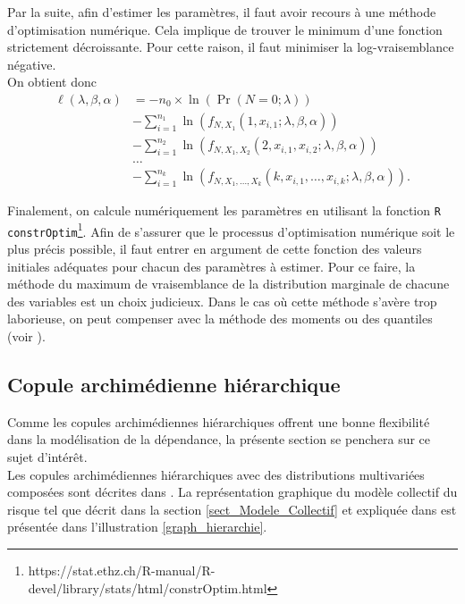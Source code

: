 \documentclass{article}
\begin{document}
		Par la suite, afin d'estimer les paramètres, il faut avoir recours à une méthode d'optimisation numérique. Cela implique de trouver le minimum d'une fonction strictement décroissante. Pour cette raison, il faut minimiser la log-vraisemblance négative.\\
		
		On obtient donc
		\begin{align}
		\ell(\lambda, \beta, \alpha) 
		&=  - n_0 \times \ln \left( \Pr (N=0 ; \lambda) \right) \nonumber\\
		& - \sum_{i=1}^{n_1} \ln \left(f_{N,X_1}(1,x_{i,1};\lambda,\beta, \alpha) \right) \nonumber \\
		& - \sum_{i=1}^{n_2} \ln \left(f_{N,X_1,X_2}(2,x_{i,1},x_{i,2};\lambda,\beta, \alpha)\right) \label{logLikelyhood_neg} \\
		& \dots \nonumber\\
		& - \sum_{i=1}^{n_k} \ln \left( f_{N,X_1,\dots,X_k}(k,x_{i,1},\dots,x_{i,k};\lambda,\beta, \alpha)\right). \nonumber
		\end{align}
		
		Finalement, on calcule numériquement les paramètres en utilisant la fonction \texttt{R} \texttt{constrOptim}\footnote{https://stat.ethz.ch/R-manual/R-devel/library/stats/html/constrOptim.html}. Afin de s'assurer que le processus d'optimisation numérique soit le plus précis possible, il faut entrer en argument de cette fonction des valeurs initiales adéquates pour chacun des paramètres à estimer. Pour ce faire, la méthode du maximum de vraisemblance de la distribution marginale de chacune des variables est un choix judicieux. Dans le cas où cette méthode s'avère trop laborieuse, on peut compenser avec la méthode des moments ou des quantiles (voir \cite{LossModels_Klugman2012}).
		

	\subsection{Copule archimédienne hiérarchique}	
	Comme les copules archimédiennes hiérarchiques offrent une bonne flexibilité dans la modélisation de la dépendance, la présente section se penchera sur ce sujet d'intérêt.\\
	
	Les copules archimédiennes hiérarchiques avec des distributions multivariées composées sont décrites dans \cite{Itre4}. La représentation graphique du modèle collectif du risque tel que décrit dans la section \ref{sect_Modele_Collectif} et expliquée dans \cite{Itre5} est présentée dans l'illustration \ref{graph_hierarchie}.
	
\end{document}
